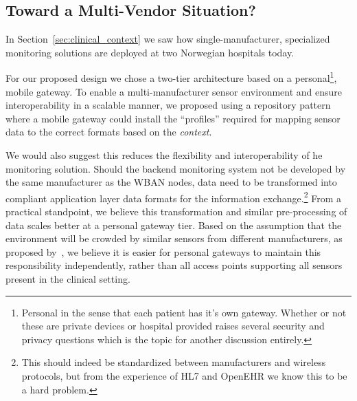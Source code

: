 \subsection{Toward a Multi-Vendor Situation?} %
\label{sub:toward_a_multi_vendor_situation}

In Section~\ref{sec:clinical_context} we saw how single-manufacturer, specialized monitoring solutions are deployed at two Norwegian hospitals today. 


For our proposed design we chose a two-tier architecture based on a personal\footnote{ Personal in the sense that each patient has it's own gateway. Whether or not these are private devices or hospital provided raises several security and privacy questions which is the topic for another discussion entirely.}, mobile gateway. To enable a multi-manufacturer sensor environment and ensure interoperability in a scalable manner, we proposed using a repository pattern where a mobile gateway could install the ``profiles'' required for mapping sensor data to the correct formats based on the \emph{context}.

We would also suggest this reduces the flexibility and interoperability of he monitoring solution. Should the backend monitoring system not be developed by the same manufacturer as the WBAN nodes, data need to be transformed into compliant application layer data formats for the information exchange.\footnote{ This should indeed be standardized between manufacturers and wireless protocols, but from the experience of HL7 and OpenEHR we know this to be a hard problem.} From a practical standpoint, we believe this transformation and similar pre-processing of data scales better at a personal gateway tier. Based on the assumption that the environment will be crowded by similar sensors from different manufacturers, as proposed by~\cite{DrAmirMohammadRahmani:2014vx}, we believe it is easier for personal gateways to maintain this responsibility independently, rather than all access points supporting all sensors present in the clinical setting.

